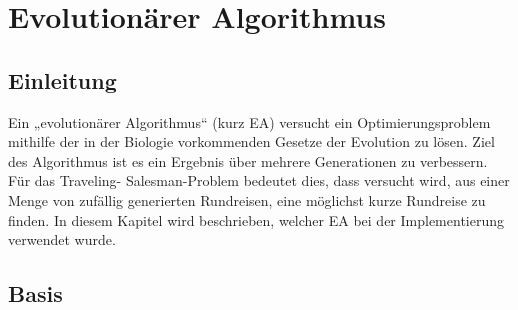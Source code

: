 \chapter{Evolutionärer Algorithmus}
\section{Einleitung}
Ein „evolutionärer Algorithmus“ (kurz EA)
versucht ein Optimierungsproblem mithilfe der in der Biologie 
vorkommenden Gesetze der Evolution zu lösen. Ziel des Algorithmus ist
es ein Ergebnis über mehrere Generationen zu verbessern. Für das Traveling-
Salesman-Problem bedeutet dies, dass versucht wird, aus einer Menge
von zufällig generierten Rundreisen, eine möglichst kurze Rundreise zu
finden. In diesem Kapitel wird beschrieben, welcher EA bei der
Implementierung verwendet wurde.

\section{Basis}


